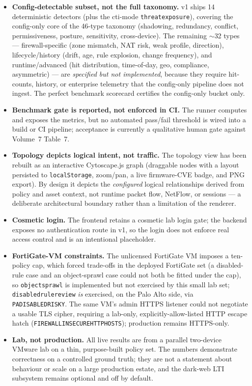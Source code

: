 \documentclass[12pt,a4paper]{report}
\renewcommand{\_}{\textunderscore\allowbreak}
\begin{document}
\begin{itemize}[leftmargin=1.4em]
  \item \textbf{Config-detectable subset, not the full taxonomy.} v1 ships 14 deterministic detectors (plus the cti-mode \texttt{threat\_exposure}), covering the config-only core of the 46-type taxonomy (shadowing, redundancy, conflict, permissiveness, posture, sensitivity, cross-device). The remaining $\sim$32 types --- firewall-specific (zone mismatch, NAT risk, weak profile, direction), lifecycle/history (drift, age, rule explosion, change frequency), and runtime/advanced (hit distribution, time-of-day, geo, compliance, asymmetric) --- are \emph{specified but not implemented}, because they require hit-counts, history, or enterprise telemetry that the config-only pipeline does not ingest. The perfect benchmark scorecard certifies the config-only bucket only.
  \item \textbf{Benchmark gate is reported, not enforced in CI.} The runner computes and exposes the metrics, but no automated pass/fail threshold is wired into a build or CI pipeline; acceptance is currently a qualitative human gate against Volume~7 Table~7.
  \item \textbf{Topology depicts logical intent, not traffic.} The topology view has been rebuilt as an interactive Cytoscape.js graph (draggable nodes with a layout persisted to \texttt{localStorage}, zoom/pan, a live firmware-CVE badge, and PNG export). By design it depicts the \emph{configured} logical relationships derived from policy and asset context, not runtime packet flow, NetFlow, or sessions --- a deliberate architectural boundary rather than a limitation of the renderer.
  \item \textbf{Cosmetic login.} The frontend retains a cosmetic lab login gate; the backend exposes no authentication route in v1, so the login does not enforce real access control and is an intentional placeholder.
  \item \textbf{FortiGate-VM constraints.} The unlicensed FortiGate VM imposes a ten-policy cap, which forced trade-offs in the deployed FortiGate set (a disabled-rule case and an object-sprawl case could not both be fitted under the cap), so \texttt{object\_sprawl} is implemented but not exercised by this small lab set; \texttt{disabled\_rule\_review} \emph{is} exercised, on the Palo Alto side, via \texttt{PA\_DISABLED\_RISKY}. The same VM's admin HTTPS listener could not negotiate a usable TLS cipher, requiring a lab-only, explicitly-allow-listed HTTP escape hatch (\texttt{FIREWALL\_INSECURE\_HTTP\_HOSTS}); production remains HTTPS-only.
  \item \textbf{Lab, not production.} All live results are from a parallel two-device VMware lab on a thin, purpose-built policy set. The numbers demonstrate correctness on a controlled ground truth; they are not a statement about behaviour or scale on a large production estate, and the dark-web LTI subsystem remains optional and off by default.
\end{itemize}
\end{document}
